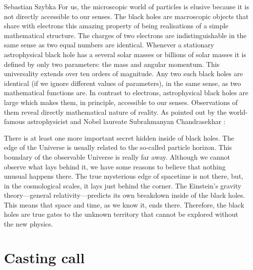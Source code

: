 \begin{artengenv}{Sebastian Szybka}
For us, the microscopic world of particles is elusive because it is not directly accessible to our senses.  The black holes are macroscopic objects that share with electrons this amazing property of being realisations of a simple mathematical structure. The charges of two electrons are indistinguishable in the same sense as two equal numbers are identical. Whenever a stationary astrophysical black hole has a several solar masses or billions of solar masses it is defined by only two parameters: the mass and angular momentum. This universality extends over ten orders of magnitude. Any two such black holes are identical (if we ignore different values of parameters), in the same sense, as two mathematical functions are. In contrast to electrons, astrophysical black holes are large which makes them, in principle, accessible to our senses. Observations of them reveal directly mathematical nature of reality. As pointed out by the world-famous astrophysicist and Nobel laureate Subrahmanyan Chandrasekhar \parencite*{chandrasekhar_shakespeare_1975}:


There is at least one more important secret hidden inside of black holes. The edge of the Universe is usually related to the so-called particle horizon. This boundary of the observable Universe is really far away. Although we cannot observe what lays behind it, we have some reasons to believe that nothing unusual happens there. The true mysterious edge of spacetime is not there, but, in the cosmological scales, it lays just behind the corner. The Einstein's gravity theory---general relativity---predicts its own breakdown inside of the black holes. This means that space and time, as we know it, ends there. Therefore, the black holes are true gates to the unknown territory that cannot be explored without the new physics.

\section{Casting call}


\end{artengenv}
